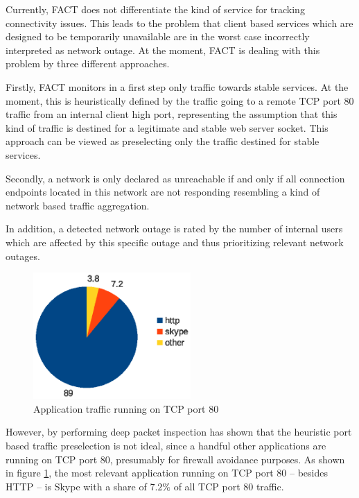Currently, \gls{FACT} does not differentiate the kind of service for tracking connectivity issues. This leads to the problem that client based services which are designed to be temporarily unavailable are in the worst case incorrectly interpreted as network outage. At the moment, \gls{FACT} is dealing with this problem by three different approaches.

Firstly, \gls{FACT} monitors in a first step only traffic towards stable services. At the moment, this is heuristically defined by the traffic going to a remote \gls{TCP} port 80 traffic from an internal client high port, representing the assumption that this kind of traffic is destined for a legitimate and stable web server socket. This approach can be viewed as preselecting only the traffic destined for stable services.  

Secondly, a network is only declared as unreachable if and only if all connection endpoints located in this network are not responding resembling a kind of network based traffic aggregation. 

In addition, a detected network outage is rated by the number of internal users which are affected by this specific outage and thus prioritizing relevant network outages.

\begin{figure}
	[ht] \centering
	\includegraphics[width=6cm]{images/application_fact_port_80.eps}
	\caption{Application traffic running on TCP port 80 \citep{SchatzmanThesis2012}} 
	\label{fig:tcp_port80}
\end{figure}

However, by performing deep packet inspection \citet{SchatzmanThesis2012} has shown that the heuristic port based traffic preselection is not ideal, since a handful other applications are running on \gls{TCP}  port 80, presumably for firewall avoidance purposes. As shown in figure \ref{fig:tcp_port80}, the most relevant application running on \gls{TCP} port 80 -- besides \gls{HTTP} -- is Skype with a share of $7.2\%$ of all \gls{TCP} port 80 traffic. 


